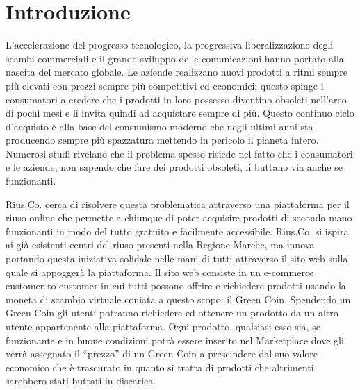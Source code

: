 \section{Introduzione}
L'accelerazione del progresso tecnologico, la progressiva liberalizzazione degli scambi commerciali e il grande sviluppo delle comunicazioni hanno portato alla nascita del mercato globale. Le aziende realizzano nuovi prodotti a ritmi sempre più elevati con prezzi sempre più competitivi ed economici; questo spinge i consumatori a credere che i prodotti in loro possesso diventino obsoleti nell'arco di pochi mesi e li invita quindi ad acquistare sempre di più. Questo continuo ciclo d'acquisto è alla base del consumismo moderno che negli ultimi anni sta producendo sempre più spazzatura mettendo in pericolo il pianeta intero. Numerosi studi \cite{Sprechi} rivelano che il problema spesso risiede nel fatto che i consumatori e le aziende, non sapendo che fare dei prodotti obsoleti, li buttano via anche se funzionanti. 
\medskip

Rius.Co. cerca di risolvere questa problematica attraverso una piattaforma per il riuso online che permette a chiunque di poter acquisire prodotti di seconda mano funzionanti in modo del tutto gratuito e facilmente accessibile. Rius.Co. si ispira ai già esistenti centri del riuso presenti nella Regione Marche, ma innova portando questa iniziativa solidale nelle mani di tutti attraverso il sito web sulla quale si appoggerà la piattaforma. Il sito web consiste in un e-commerce customer-to-customer in cui tutti possono offrire e richiedere prodotti usando la moneta di scambio virtuale coniata a questo scopo: il Green Coin. Spendendo un Green Coin gli utenti potranno richiedere ed ottenere un prodotto da un altro utente appartenente alla piattaforma. Ogni prodotto, qualsiasi esso sia, se funzionante e in buone condizioni potrà essere inserito nel Marketplace dove gli verrà assegnato il “prezzo” di un Green Coin a prescindere dal suo valore economico che è trascurato in quanto si tratta di prodotti che altrimenti sarebbero stati buttati in discarica. 
\medskip


